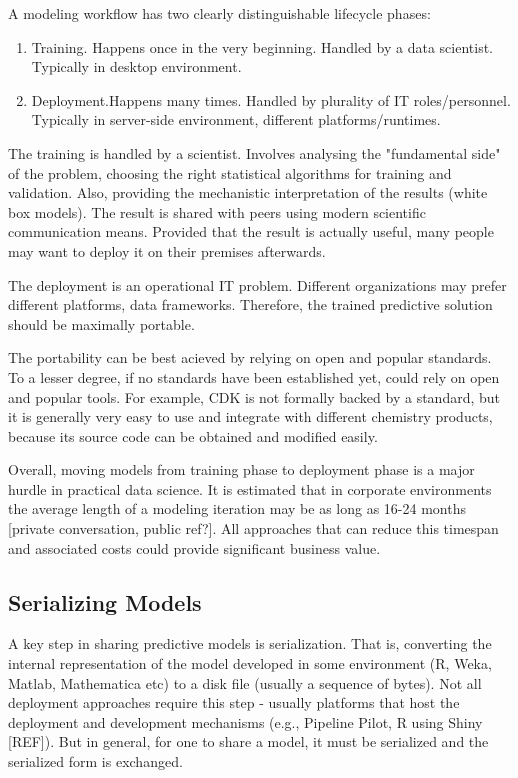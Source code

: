 \documentclass[12pt,letterpaper]{article}
\begin{document}
A modeling workflow has two clearly distinguishable lifecycle phases:
\begin{enumerate}
  \item Training. Happens once in the very beginning. Handled by a data
  scientist. Typically in desktop environment. 
  \item Deployment.Happens many times. Handled by plurality of IT 
  roles/personnel. Typically in server-side environment, different 
  platforms/runtimes. 
\end{enumerate}

The training is handled by a scientist. Involves analysing the
"fundamental side" of the problem, choosing the right statistical 
algorithms for training and validation. Also, providing the mechanistic
interpretation of the results (white box models). The result is 
shared with peers using modern scientific communication means. Provided
that the result is actually useful, many people may want to deploy it
on their premises afterwards.

The deployment is an operational IT problem. Different organizations 
may prefer different platforms, data frameworks. Therefore, the trained
predictive solution should be maximally portable.

The portability can be best acieved by relying on open and popular
standards. To a lesser degree, if no standards have been established yet,
could rely on open and popular tools. For example, CDK is not formally
backed by a standard, but it is generally very easy to use and integrate
with different chemistry products, because its source code can be obtained
and modified easily.

Overall, moving models from training phase to deployment phase is a
major hurdle in practical data science. It is estimated that in corporate
environments the average length of a modeling iteration may be as long
as 16-24 months [private conversation, public ref?]. All approaches that
can reduce this timespan and associated costs could provide significant
business value.

\subsection{Serializing Models}
\label{sec:serializing-models}

A key step in sharing predictive models is serialization. That is,
converting the internal representation of the model developed in some
environment (R, Weka, Matlab, Mathematica etc) to a disk file (usually
a sequence of bytes). Not all deployment approaches require this step
- usually platforms that host the deployment and development
mechanisms (e.g., Pipeline Pilot, R using Shiny [REF]). But in general, for one to share a
model, it must be serialized and the serialized form is exchanged.
\end{document}
